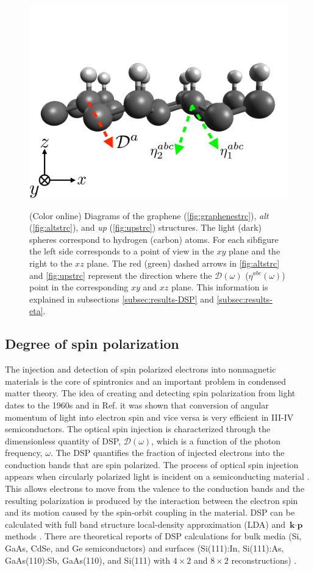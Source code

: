 \documentclass[pss]{wiley2sp} %
\begin{document}
\begin{figure}[t]
{ \includegraphics[width=0.49\linewidth]{strc/up2}\label{fig:upstrc}}
\caption{(Color online) Diagrams of the graphene (\ref{fig:graphenestrc}), \emph{alt} (\ref{fig:altstrc}), and \emph{up} (\ref{fig:upstrc}) structures. The light (dark) spheres correspond to hydrogen (carbon) atoms. For each sibfigure the left side corresponds to a point of view in the $xy$ plane and the right to the $xz$ plane. The red (green) dashed arrows in \ref{fig:altstrc} and \ref{fig:upstrc} represent the direction where the $\mathcal{D}(\omega)$ ($\eta^{abc}(\omega)$) point in the corresponding $xy$ and $xz$ plane. This information is explained in subsections \ref{subsec:results-DSP} and \ref{subsec:results-eta}.\label{fig:structures}}
\end{figure}

\subsection{Degree of spin polarization}

The injection and detection of spin polarized electrons into nonmagnetic materials is the core of spintronics \cite{vzuticRMP04,fertRMP08} and an important  problem in condensed matter theory.
The idea of creating and detecting spin polarization from light dates to the 1960s \cite{LampelPRL68} and in Ref. \cite{dyakonovOO84} it was shown that conversion of angular momentum of light into electron spin and vice versa is very efficient in III-IV semiconductors. The optical spin injection is characterized through the dimensionless quantity of DSP, $\mathcal{D}(\omega)$, which is a function of the photon frequency, $\omega$. The DSP quantifies the fraction of injected electrons into the conduction bands that are spin polarized.
The process of optical spin injection appears when circularly polarized light is incident on a semiconducting material \cite{dyakonovOO84}. This allows electrons to move from the valence to the conduction bands and the resulting polarization is produced by the interaction between the electron spin and its motion caused by the spin-orbit coupling in the material. DSP can be calculated with full band structure local-density approximation (LDA) and $\textbf{k}\cdot\textbf{p}$ methods \cite{nastosPRB07,cabellosPRB09}. There are theoretical reports of DSP calculations for bulk media (Si, GaAs, CdSe, and Ge semiconductors) \cite{nastosPRB07,cabellosPRB09} and surfaces (Si(111):In, Si(111):As, GaAs(110):Sb, GaAs(110), and Si(111) with $4\times2$ and $8\times2$ reconstructions) \cite{mendozaPRB12,arzatePRB14}. 
\end{document}
